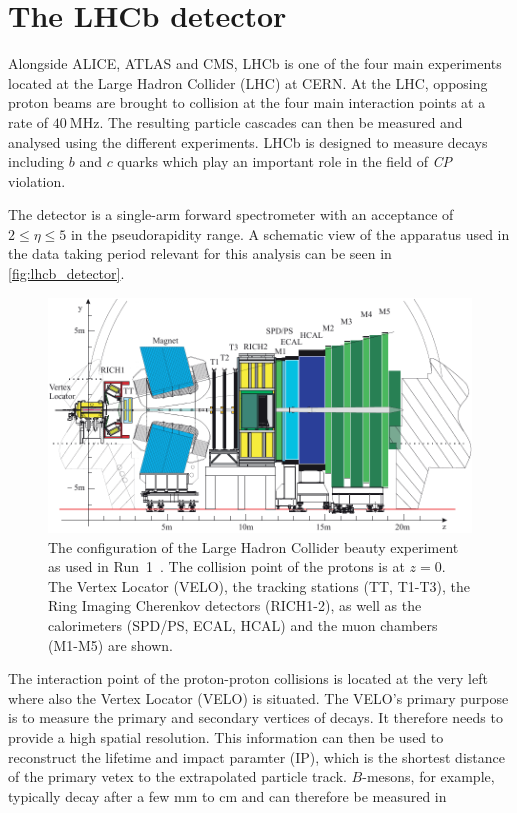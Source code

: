 \section{The LHCb detector}
\label{sec:Detector}
Alongside ALICE, ATLAS and CMS, LHCb is one of the four main experiments located at the Large Hadron Collider (LHC) at CERN. At the LHC, opposing proton beams are brought to
collision at the four main interaction points at a rate of $\qty{40}{\mega\hertz}$. The resulting particle cascades can then be measured and analysed using the
different experiments. LHCb is designed to measure decays including $b$ and $c$ quarks which play an important role in the field of \textit{CP} violation. 

The detector is a single-arm forward spectrometer with an acceptance of $2 \leq \eta \leq 5$ in the pseudorapidity range. A schematic view of the apparatus used in the data taking
period relevant for this analysis can be seen in \autoref{fig:lhcb_detector}.
\begin{figure}
    \centering
    \includegraphics[width = .8\textwidth]{"content/pics/LHCb-Detektor.pdf"}
    \caption{The configuration of the Large Hadron Collider beauty experiment as used in Run~1~\cite{LHCb_detector}. 
    The collision point of the protons is at $z=0$. The Vertex Locator (VELO),
    the tracking stations (TT, T1-T3), the Ring Imaging Cherenkov detectors (RICH1-2), as well as the calorimeters (SPD/PS, ECAL, HCAL) and the muon chambers (M1-M5) are shown.}
    \label{fig:lhcb_detector}
\end{figure}
The interaction point of the proton-proton collisions is located at the very left where also the Vertex Locator (VELO) is situated. The VELO's primary purpose is to 
measure the primary and secondary vertices of decays. It therefore needs to provide a high spatial resolution. This information can then be used to reconstruct the lifetime and
impact paramter (IP), which is the shortest distance of the primary vetex to the extrapolated particle track. \mbox{$B$-mesons}, for example, typically decay after a few $\unit{\milli\metre}$ to $\unit{\centi\metre}$ and can therefore be measured in 
